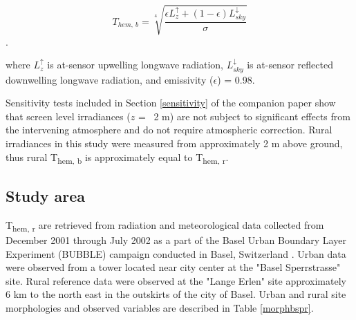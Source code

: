 \begin{equation}
\label{ruralt}
T_{hem,~ b} = \sqrt[4]{\frac{\epsilon L_z^\uparrow + (1 - \epsilon)L_{sky}^\downarrow}{\sigma}}
\end{equation}.

\noindent where $L_z^\uparrow$ is at-sensor upwelling longwave radiation, $L_{sky}^\downarrow$ is at-sensor reflected downwelling longwave radiation, and emissivity ($\epsilon$) = 0.98.

Sensitivity tests included in Section \ref{sensitivity} of the companion paper show that screen level irradiances ($ z $ = ~2 \si{\meter}) are not subject to significant effects from the intervening atmosphere and do not require atmospheric correction. Rural irradiances in this study were measured from approximately 2 \si{\meter} above ground, thus rural T\textsubscript{hem, b} is approximately equal to T\textsubscript{hem, r}.

\subsection{Study area}

T\textsubscript{hem, r} are retrieved from radiation and meteorological data collected from December 2001 through July 2002 as a part of the Basel Urban Boundary Layer Experiment (BUBBLE) campaign conducted in Basel, Switzerland \citep{Rotach2005}. Urban data were observed from a tower located near city center at the "Basel Sperrstrasse" site. Rural reference data were observed at the "Lange Erlen" site approximately 6 \si{\kilo \meter} to the north east in the outskirts of the city of Basel. Urban and rural site morphologies and observed variables are described in Table \ref{morphbspr}.

